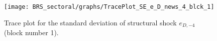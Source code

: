 \begin{figure}[H]
\centering
  \texttt{[image: BRS\_sectoral/graphs/TracePlot\_SE\_e\_D\_news\_4\_blck\_1]}\\
    \caption{Trace plot for the standard deviation of structural shock ${e_{D,-4}}$ (block number 1).}
\end{figure}

